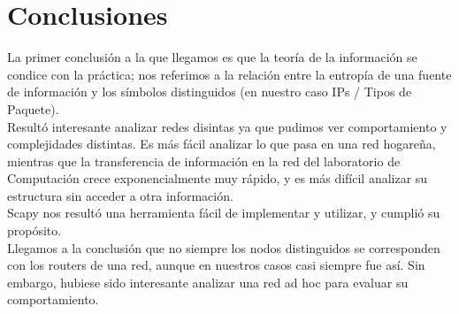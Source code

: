 \section{Conclusiones}

La primer conclusión a la que llegamos es que la teoría de la información se condice con la práctica; nos referimos a la relación entre la entropía de una fuente de información y los símbolos distinguidos (en nuestro caso IPs / Tipos de Paquete).\\

Resultó interesante analizar redes disintas ya que pudimos ver comportamiento y complejidades distintas. Es más fácil analizar lo que pasa en una red hogareña, mientras que la transferencia de información en la red del laboratorio de Computación crece exponencialmente muy rápido, y es más difícil analizar su estructura sin acceder a otra información.\\

Scapy nos resultó una herramienta fácil de implementar y utilizar, y cumplió su propósito.\\

Llegamos a la conclusión que no siempre los nodos distinguidos se corresponden con los routers de una red, aunque en nuestros casos casi siempre fue así. Sin embargo, hubiese sido interesante analizar una red ad hoc para evaluar su comportamiento.\\